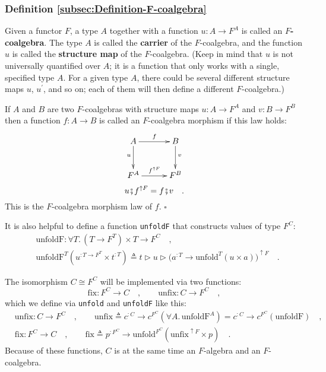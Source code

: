 \subsubsection{Definition \label{subsec:Definition-F-coalgebra}\ref{subsec:Definition-F-coalgebra}}

Given a functor $F$, a type $A$ together with a function $u:A\rightarrow F^{A}$
is called an $F$\textbf{-coalgebra}. The type
$A$ is called the \textbf{carrier} of the $F$-coalgebra, and the
function $u$ is called the \textbf{structure map} of the $F$-coalgebra.
(Keep in mind that $u$ is not universally quantified over $A$; it
is a function that only works with a single, specified type $A$.
For a given type $A$, there could be several different structure
maps $u$, $u^{\prime}$, and so on; each of them will then define
a different $F$-coalgebra.)

If $A$ and $B$ are two $F$-coalgebras with structure maps $u:A\rightarrow F^{A}$
and $v:B\rightarrow F^{B}$ then a function $f:A\rightarrow B$ is
called an $F$-coalgebra morphism if this law holds:
\[
\xymatrix{\xyScaleY{2.3pc}\xyScaleX{2.5pc}A\ar[d]\sb(0.4){u}\ar[r]\sp(0.5){f} & B\ar[d]\sp(0.4){v}\\
F^{A}\ar[r]\sp(0.5){f^{\uparrow F}} & F^{B}
}
\]
\[
u\bef f^{\uparrow F}=f\bef v\quad.
\]
This is the $F$-coalgebra morphism law of $f$. $\square$

It is also helpful to define a function \lstinline!unfoldF! that
constructs values of type $F^{C}$: 
\begin{align*}
 & \text{unfoldF}:\forall T.\,(T\rightarrow F^{T})\times T\rightarrow F^{C}\quad,\\
 & \text{unfoldF}^{T}(u^{:T\rightarrow F^{T}}\times t^{:T})\triangleq t\triangleright u\triangleright\big(a^{:T}\rightarrow\text{unfold}^{T}(u\times a)\big)^{\uparrow F}\quad.
\end{align*}

The isomorphism $C\cong F^{C}$ will be implemented via two functions:
\[
\text{fix}:F^{C}\rightarrow C\quad,\quad\quad\text{unfix}:C\rightarrow F^{C}\quad,
\]
which we define via \lstinline!unfold! and \lstinline!unfoldF! like
this:
\begin{align*}
 & \text{unfix}:C\rightarrow F^{C}\quad,\quad\quad\text{unfix}\triangleq c^{:C}\rightarrow c^{F^{C}}(\forall A.\,\text{unfoldF}^{A})=c^{:C}\rightarrow c^{F^{C}}(\text{unfoldF})\quad,\\
 & \text{fix}:F^{C}\rightarrow C\quad,\quad\quad\text{fix}\triangleq p^{:F^{C}}\rightarrow\text{unfold}^{F^{C}}(\text{unfix}^{\uparrow F}\times p)\quad.
\end{align*}
Because of these functions, $C$ is at the same time an $F$-algebra
and an $F$-coalgebra.


